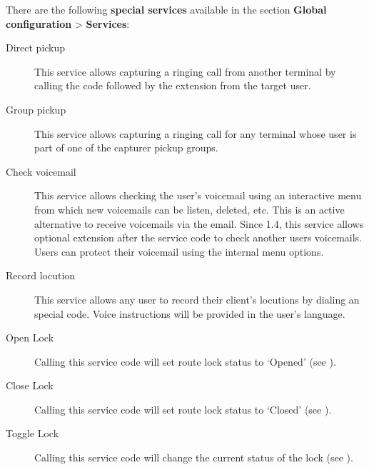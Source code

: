 \documentclass[letterpaper,10pt,english]{sphinxmanual}
\begin{document}
There are the following \textbf{special services} available in the section \textbf{Global
configuration} \textgreater{} \textbf{Services}:
\begin{description}
\item[{Direct pickup}] \leavevmode{}\label{administration_portal/platform/services:term-direct-pickup}
This service allows capturing a ringing call from another terminal by
calling the code followed by the extension from the target user.

\item[{Group pickup}] \leavevmode{}\label{administration_portal/platform/services:term-group-pickup}
This service allows capturing a ringing call for any terminal whose user
is part of one of the capturer pickup groups.

\item[{Check voicemail}] \leavevmode{}\label{administration_portal/platform/services:term-check-voicemail}
This service allows checking the user's voicemail using an interactive
menu from which new voicemails can be listen, deleted, etc. This is an
active alternative to receive voicemails via the email. Since 1.4, this
service allows optional extension after the service code to check
another users voicemails. Users can protect their voicemail using the
internal menu options.

\item[{Record locution}] \leavevmode{}\label{administration_portal/platform/services:term-record-locution}
This service allows any user to record their client's locutions by
dialing an special code. Voice instructions will be provided in the
user's language.

\item[{Open Lock}] \leavevmode{}\label{administration_portal/platform/services:term-open-lock}
Calling this service code will set route lock status to `Opened' (see {\hyperref[administration_portal/client/vpbx/routing_tools/route_locks:route\string-locks]{}}).

\item[{Close Lock}] \leavevmode{}\label{administration_portal/platform/services:term-close-lock}
Calling this service code will set route lock status to `Closed' (see {\hyperref[administration_portal/client/vpbx/routing_tools/route_locks:route\string-locks]{}}).

\item[{Toggle Lock}] \leavevmode{}\label{administration_portal/platform/services:term-toggle-lock}
Calling this service code will change the current status of the lock (see {\hyperref[administration_portal/client/vpbx/routing_tools/route_locks:route\string-locks]{}}).

\end{description}
\end{document}
